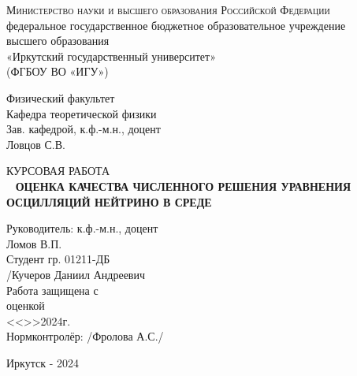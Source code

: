 \documentclass[a4paper,12pt]{article}
\begin{document}
\fontsize{14pt}{20pt}\selectfont	

\onehalfspacing
\pagestyle{plain}

\begin{titlepage}
  \begin{center}
    {%
      \scshape
      Министерство науки и высшего образования Российской Федерации\\
    }
    федеральное государственное бюджетное образовательное учреждение\\
    высшего образования \\
    «Иркутский государственный университет»\\
    (ФГБОУ ВО «ИГУ»)
  \end{center}
  \vspace*{3em}

  \begin{flushright}
    \begin{minipage}{70mm}
      Физический факультет\\
      Кафедра теоретической физики\\
      Зав. кафедрой, к.ф.-м.н., доцент\\
      \underline{\hspace{20mm}} Ловцов С.В.
    \end{minipage}
  \end{flushright}
  \vspace*{4em}

	\begin{center}
    КУРСОВАЯ РАБОТА\\[2ex]\
    \bfseries%
		ОЦЕНКА КАЧЕСТВА ЧИСЛЕННОГО РЕШЕНИЯ УРАВНЕНИЯ ОСЦИЛЛЯЦИЙ НЕЙТРИНО В 
		СРЕДЕ
	\end{center}

  \vspace*{3em}

  \begin{flushright}
    \begin{minipage}{80mm} 
    Руководитель: к.ф.-м.н., доцент\\
    \underline{\hspace{30mm}}Ломов В.П.\\
    Студент гр. 01211-ДБ\\
    \underline{\hspace{20mm}}/Кучеров Даниил Андреевич\\
    Работа защищена с\\
    оценкой \underline{\hspace{40mm}}\\
    <<\underline{\hspace{8mm}}>>\underline{\hspace{22mm}}2024г.\\
    Нормконтролёр:
    \underline{\hspace{30mm}}/Фролова А.С./\\
    \end{minipage}
  \end{flushright}

  \vfill
  \begin{center}
    Иркутск - 2024
  \end{center}
\end{titlepage}
\end{document}
